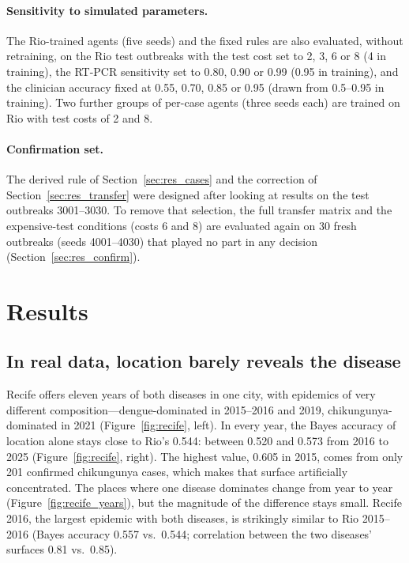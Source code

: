 \documentclass[11pt,a4paper]{article}
\begin{document}
\paragraph{Sensitivity to simulated parameters.} The Rio-trained agents (five seeds) and the fixed rules are also evaluated, without retraining, on the Rio test outbreaks with the test cost set to 2, 3, 6 or 8 (4 in training), the RT-PCR sensitivity set to 0.80, 0.90 or 0.99 (0.95 in training), and the clinician accuracy fixed at 0.55, 0.70, 0.85 or 0.95 (drawn from 0.5--0.95 in training). Two further groups of per-case agents (three seeds each) are trained on Rio with test costs of 2 and 8.

\paragraph{Confirmation set.} The derived rule of Section~\ref{sec:res_cases} and the correction of Section~\ref{sec:res_transfer} were designed after looking at results on the test outbreaks 3001--3030. To remove that selection, the full transfer matrix and the expensive-test conditions (costs 6 and 8) are evaluated again on 30 fresh outbreaks (seeds 4001--4030) that played no part in any decision (Section~\ref{sec:res_confirm}).

\section{Results}
\label{sec:results}

\subsection{In real data, location barely reveals the disease}
\label{sec:res_spatial}

Recife offers eleven years of both diseases in one city, with epidemics of very different composition---dengue-dominated in 2015--2016 and 2019, chikungunya-dominated in 2021 (Figure~\ref{fig:recife}, left). In every year, the Bayes accuracy of location alone stays close to Rio's 0.544: between 0.520 and 0.573 from 2016 to 2025 (Figure~\ref{fig:recife}, right). The highest value, 0.605 in 2015, comes from only 201 confirmed chikungunya cases, which makes that surface artificially concentrated. The places where one disease dominates change from year to year (Figure~\ref{fig:recife_years}), but the magnitude of the difference stays small. Recife 2016, the largest epidemic with both diseases, is strikingly similar to Rio 2015--2016 (Bayes accuracy 0.557 vs.\ 0.544; correlation between the two diseases' surfaces 0.81 vs.\ 0.85).
\end{document}
